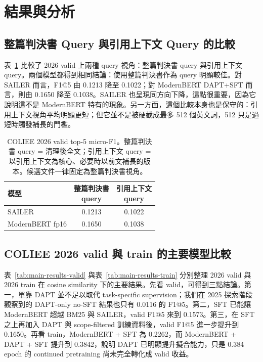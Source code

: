 \section{結果與分析}

\subsection{整篇判決書 Query 與引用上下文 Query 的比較}

表~\ref{tab:query-ablation} 比較了 2026 valid 上兩種 query 視角：整篇判決書 query 與引用上下文 query。兩個模型都得到相同結論：使用整篇判決書作為 query 明顯較佳。對 SAILER 而言，F1@5 由 0.1213 降至 0.1022；對 ModernBERT DAPT+SFT 而言，則由 0.1650 降至 0.1038。SAILER 也呈現同方向下降，這點很重要，因為它說明這不是 ModernBERT 特有的現象。另一方面，這個比較本身也是保守的：引用上下文視角平均明顯更短；但它並不是被硬截成最多 512 個英文詞，512 只是過短時觸發補長的門檻。

\begin{table}[t]
  \centering
  \small
  \begin{tabular}{lcc}
    \toprule
    模型 & \shortstack{整篇判決書\\query} & \shortstack{引用上下文\\query} \\
    \midrule
    SAILER & 0.1213 & 0.1022 \\
    ModernBERT fp16 & 0.1650 & 0.1038 \\
    \bottomrule
  \end{tabular}
  \caption{COLIEE 2026 valid top-5 micro-F1。整篇判決書 query = 清理後全文；引用上下文 query = 以引用上下文為核心、必要時以前文補長的版本。候選文件一律固定為整篇判決書視角。}
  \label{tab:query-ablation}
\end{table}

\subsection{COLIEE 2026 valid 與 train 的主要模型比較}

表~\ref{tab:main-results-valid} 與表~\ref{tab:main-results-train} 分別整理 2026 valid 與 2026 train 在 cosine similarity 下的主要結果。先看 valid，可得到三點結論。第一，單靠 DAPT 並不足以取代 task-specific supervision；我們在 2025 探索階段觀察到的 DAPT-only no-SFT 結果也只有 0.0116 的 F1@5。第二，SFT 已能讓 ModernBERT 超越 BM25 與 SAILER，valid F1@5 來到 0.1573。第三，在 SFT 之上再加入 DAPT 與 scope-filtered 訓練資料後，valid F1@5 進一步提升到 0.1650。再看 train，ModernBERT + SFT 為 0.2262，而 ModernBERT + DAPT + SFT 提升到 0.3842，說明 DAPT 已明顯提升擬合能力，只是 0.384 epoch 的 continued pretraining 尚未完全轉化成 valid 收益。

